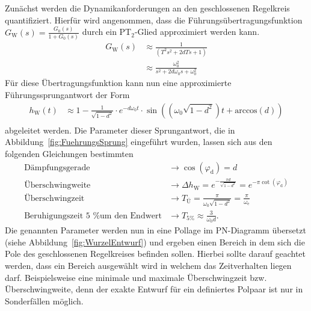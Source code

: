 Zunächst werden die Dynamikanforderungen an den geschlossenen Regelkreis quantifiziert. Hierfür wird angenommen, dass die Führungsübertragungsfunktion $G_{\text{W}}(s)=\frac{G_{0}(s)}{1+G_{0}(s)}$ durch ein PT$_{2}$-Glied approximiert werden kann.
%
\begin{equation*}
\begin{aligned}
%
G_{\text{W}}(s)&\approx \frac{1}{\left(T^{2}s^{2}+2dTs+1\right)}\\
%
&\approx \frac{\omega^{2}_{0}}{s^{2}+2d\omega_{0}s+\omega^{2}_{0}}
%
\end{aligned}
\end{equation*}
%
Für diese Übertragungsfunktion kann nun eine approximierte Führungssprungantwort der Form
%
\begin{equation*}
\begin{aligned}
%
h_{\text{W}}(t)&\approx 1-\frac{1}{\sqrt{1-d^{2}}}\cdot e^{-d\omega_{0}t}\cdot\sin\left(\left(\omega_{0}\sqrt{1-d^{2}}\right)t+\text{arccos}(d)\right)\\
%
\end{aligned}
\end{equation*}
%
abgeleitet werden. Die Parameter dieser Sprungantwort, die in Abbildung~\ref{fig:FuehrungsSprung} eingeführt wurden, lassen sich aus den folgenden Gleichungen bestimmten
%
\begin{equation*}
\begin{aligned}
%
\text{Dämpfungsgerade} &\rightarrow \cos(\varphi_{\text{d}})=d\\
\text{Überschwingweite} &\rightarrow \Delta h_{\text{W}}=e^{-\frac{\pi d}{\sqrt{1-d^{2}}}}=e^{-\pi\cot(\varphi_{\text{d}})}\\
\text{Überschwingzeit} &\rightarrow T_{\text{Ü}}=\frac{\pi}{\omega_{0}\sqrt{1-d^{2}}}=\frac{\pi}{\omega_{\text{e}}}\\
 \text{Beruhigungszeit 5 \% um den Endwert} &\rightarrow T_{5\%} \approx \frac{3}{\omega_{0}d}.
%
\end{aligned}
\end{equation*}
%
Die genannten Parameter werden nun in eine Pollage im PN-Diagramm übersetzt (siehe Abbildung~\ref{fig:WurzelEntwurf}) und ergeben einen Bereich in dem sich die Pole des geschlossenen Regelkreises befinden sollen. Hierbei sollte darauf geachtet werden, dass ein Bereich ausgewählt wird in welchem das Zeitverhalten liegen darf. Beispielsweise eine minimale und maximale Überschwingzeit bzw. Überschwingweite, denn der exakte Entwurf für ein definiertes Polpaar ist nur in Sonderfällen möglich.
%
